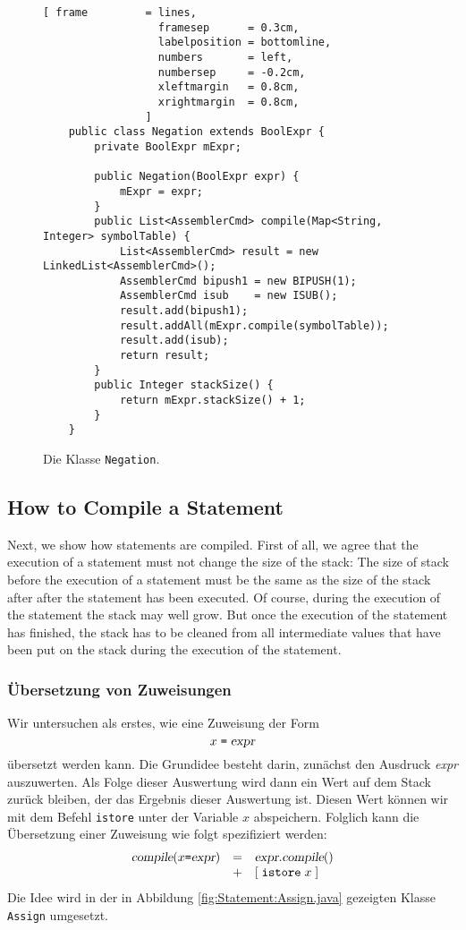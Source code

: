 \begin{figure}[!ht]
\centering
\begin{Verbatim}[ frame         = lines, 
                  framesep      = 0.3cm, 
                  labelposition = bottomline,
                  numbers       = left,
                  numbersep     = -0.2cm,
                  xleftmargin   = 0.8cm,
                  xrightmargin  = 0.8cm,
                ]
    public class Negation extends BoolExpr {
        private BoolExpr mExpr;
    
        public Negation(BoolExpr expr) {
            mExpr = expr;
        }
        public List<AssemblerCmd> compile(Map<String, Integer> symbolTable) {
            List<AssemblerCmd> result = new LinkedList<AssemblerCmd>();
            AssemblerCmd bipush1 = new BIPUSH(1);
            AssemblerCmd isub    = new ISUB();
            result.add(bipush1);
            result.addAll(mExpr.compile(symbolTable));
            result.add(isub);
            return result;
        }
        public Integer stackSize() {
            return mExpr.stackSize() + 1;
        }    
    }
\end{Verbatim}
\vspace*{-0.3cm}
\caption{Die Klasse \texttt{Negation}.}
\label{fig:Expr:Negation.java}
\end{figure}


\subsection{How to Compile a Statement}
Next, we show how statements are compiled.  First of all, we agree that the execution of a statement
must not change the size of the stack:  The size of stack before the execution of a statement must
be the same as the size of the stack after after the statement has been executed.
Of course, during the execution of the statement the stack may well
grow.  But once the execution of the statement has finished, the stack has to be cleaned from all
intermediate values that have been put on the stack during the execution of the statement.


\subsubsection{\"Ubersetzung von Zuweisungen}
Wir untersuchen als erstes, wie eine Zuweisung der Form
\[ x \;\texttt{=}\; \textsl{expr} \]
\"ubersetzt werden kann.  Die Grundidee besteht darin, zun\"achst den Ausdruck \textsl{expr}
auszuwerten.  Als Folge dieser Auswertung wird dann ein Wert auf dem Stack zur\"uck bleiben, der das
Ergebnis dieser Auswertung ist.  Diesen Wert k\"onnen wir mit dem Befehl \texttt{istore} unter der
Variable $x$ abspeichern.  Folglich kann die \"Ubersetzung einer Zuweisung wie folgt spezifiziert werden:
\[
   \begin{array}[t]{lcl}
   \textsl{compile}(x \texttt{=} \textsl{expr}) & = & 
         \textsl{expr}.\textsl{compile}()  \\
   & + & [\;\texttt{istore}\;x\;]  
\end{array}
\]
Die Idee wird in der in Abbildung \ref{fig:Statement:Assign.java} gezeigten Klasse
\texttt{Assign} umgesetzt.

